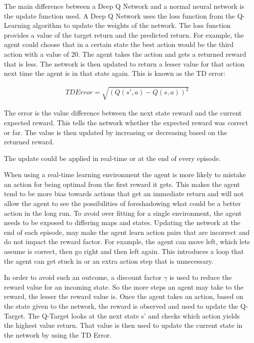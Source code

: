 The main difference between a Deep Q Network and a normal neural network is the
update function used. A Deep Q Network uses the loss function from the
Q-Learning algorithm to update the weights of the network. The loss function
provides a value of the target return and the predicted return. For example, the
agent could choose that in a certain state the best action would be the third
action with a value of 20. The agent takes the action and gets a returned reward
that is less. The network is then updated to return a lesser value for that
action next time the agent is in that state again. This is known as the TD
error:

\begin{align}
    TD Error = \sqrt{(Q(s',a) - Q(s,a))^{2}}
\end{align}

The error is the value difference between the next state reward and the current
expected reward. This tells the network whether the expected reward was correct
or far. The value is then updated by increasing or decreasing based on the
returned reward. \cite{pandey2010reinforcement}

The update could be applied in real-time or at the end of every episode.

When using a real-time learning environment the agent is more likely to mistake
an action for being optimal from the first reward it gets. This makes the agent
tend to be more bias towards actions that get an immediate return and will not
allow the agent to see the possibilities of foreshadowing what could be a better
action in the long run. To avoid over fitting for a single environment, the
agent needs to be exposed to differing maps and states. Updating the network at
the end of each episode, may make the agent learn action pairs that are
incorrect and do not impact the reward factor. For example, the agent can move
left, which lets assume is correct, then go right and then left again. This
introduces a loop that the agent can get stuck in or an extra action step that
is unnecessary.

In order to avoid such an outcome, a discount factor $\gamma$ is used to reduce
the reward value for an incoming state. So the more steps an agent may take to
the reward, the lesser the reward value is. Once the agent takes an action,
based on the state given to the network, the reward is observed and used to
update the Q-Target. The Q-Target looks at the next state s' and checks which
action yields the highest value return. That value is then used to update the
current state in the network by using the TD Error.

